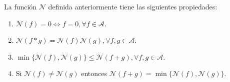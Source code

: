 \begin{proposition}
La función $\mathcal{N}$ definida anteriormente tiene las siguientes propiedades:
\begin{enumerate}[label=\textnormal{(\roman*)}]
    \item $\mathcal{N}(f)=0 \iff f=0, \forall f \in \mathcal{A}$.
    \item $\mathcal{N}(f*g)=\mathcal{N}(f)\mathcal{N}(g), \forall f,g \in \mathcal{A}$.
    \item $\min \{\mathcal{N}(f),\mathcal{N}(g)\}\leq \mathcal{N}(f+g), \forall f,g \in \mathcal{A}$. 
    \item Si $\mathcal{N}(f) \ne \mathcal{N}(g)$ entonces $\mathcal{N}(f+g)=\min \{ \mathcal{N}(f),\mathcal{N}(g) \}$.
\end{enumerate}
\end{proposition}
